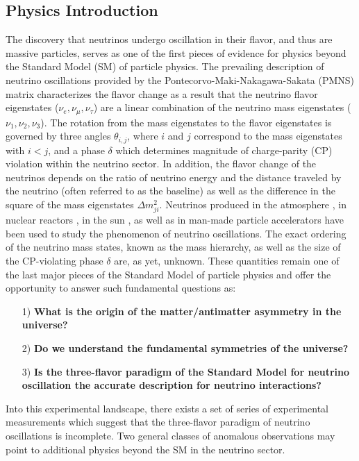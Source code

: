 \subsection{Physics Introduction}
The discovery that neutrinos undergo oscillation in their flavor, and thus are massive particles, serves as one of the first pieces of evidence for physics beyond the Standard Model (SM) of particle physics. The prevailing description of neutrino oscillations provided by the Pontecorvo-Maki-Nakagawa-Sakata (PMNS) matrix characterizes the flavor change as a result that the neutrino flavor eigenstates ($\nu_{e}, \nu_{\mu}, \nu_{\tau}$) are a linear combination of the neutrino mass eigenstates ($\nu_{1}, \nu_{2}, \nu_{3}$). The rotation from the mass eigenstates to the flavor eigenstates is governed by three angles $\theta_{i,j}$, where $i$ and $j$ correspond to the mass eigenstates with $i < j$, and a phase $\delta$ which determines magnitude of charge-parity (CP) violation within the neutrino sector. In addition, the flavor change of the neutrinos depends on the ratio of neutrino energy and the distance traveled by the neutrino (often referred to as the baseline) as well as the difference in the square of the mass eigenstates $\Delta m_{ji}^{2}$. Neutrinos produced in the atmosphere \cite{No1, No2, No3}, in nuclear reactors \cite{No4, No5, No6}, in the sun \cite{No7, No8, No9}, as well as in man-made particle accelerators \cite{No10, No11, No12} have been used to study the phenomenon of neutrino oscillations. The exact ordering of the neutrino mass states, known as the mass hierarchy, as well as the size of the CP-violating phase $\delta$ are, as yet, unknown. These quantities remain one of the last major pieces of the Standard Model of particle physics and offer the opportunity to answer such fundamental questions as:

\begin{itemize}
\item[1)] \textbf{What is the origin of the matter/antimatter asymmetry in the universe?}

\item[2)] \textbf{Do we understand the fundamental symmetries of the universe?}

\item[3)] \textbf{Is the three-flavor paradigm of the Standard Model for neutrino oscillation the accurate description for neutrino interactions?}
\end{itemize}

Into this experimental landscape, there exists a set of series of experimental measurements which suggest that the three-flavor paradigm of neutrino oscillations is incomplete. Two general classes of anomalous observations may point to additional physics beyond the SM  in the neutrino sector.


